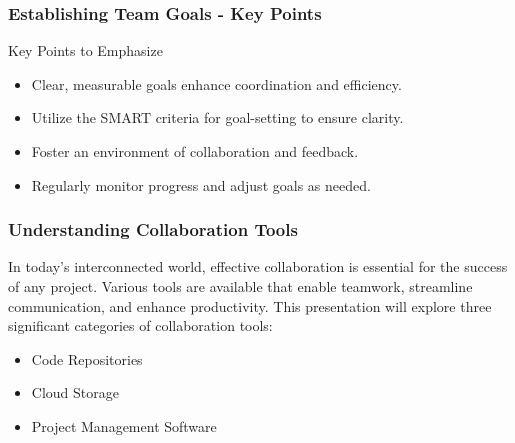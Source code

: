 \documentclass[aspectratio=169]{beamer}
\begin{document}
\begin{frame}[fragile]
    \frametitle{Establishing Team Goals - Key Points}
    \begin{block}{Key Points to Emphasize}
        \begin{itemize}
            \item Clear, measurable goals enhance coordination and efficiency.
            \item Utilize the SMART criteria for goal-setting to ensure clarity.
            \item Foster an environment of collaboration and feedback.
            \item Regularly monitor progress and adjust goals as needed.
        \end{itemize}
    \end{block}
\end{frame}

\begin{frame}[fragile]
    \frametitle{Understanding Collaboration Tools}
    In today’s interconnected world, effective collaboration is essential for the success of any project. Various tools are available that enable teamwork, streamline communication, and enhance productivity. This presentation will explore three significant categories of collaboration tools:
    \begin{itemize}
        \item Code Repositories
        \item Cloud Storage
        \item Project Management Software
    \end{itemize}
\end{frame}
\end{document}
